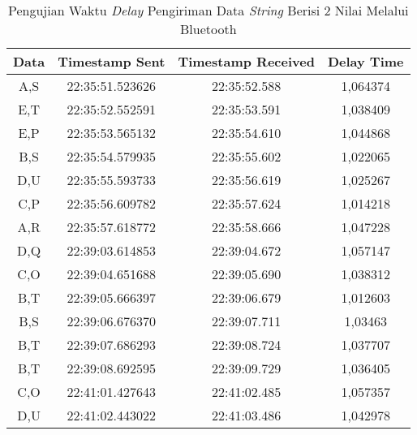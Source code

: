 \begin{table}[!ht]
  \centering
  \caption{Pengujian Waktu \emph{Delay} Pengiriman Data \emph{String} Berisi 2 Nilai Melalui Bluetooth}
  \label{tbl:delayBluetooth}
  \begin{tabular}{|ccc|c|}
  \hline
  \multicolumn{1}{|c|}{Data} & \multicolumn{1}{c|}{Timestamp Sent}  & Timestamp Received & Delay Time  \\ \hline
  \multicolumn{1}{|c|}{A,S}  & \multicolumn{1}{c|}{22:35:51.523626} & 22:35:52.588       & 1,064374    \\ \hline
  \multicolumn{1}{|c|}{E,T}  & \multicolumn{1}{c|}{22:35:52.552591} & 22:35:53.591       & 1,038409    \\ \hline
  \multicolumn{1}{|c|}{E,P}  & \multicolumn{1}{c|}{22:35:53.565132} & 22:35:54.610       & 1,044868    \\ \hline
  \multicolumn{1}{|c|}{B,S}  & \multicolumn{1}{c|}{22:35:54.579935} & 22:35:55.602       & 1,022065    \\ \hline
  \multicolumn{1}{|c|}{D,U}  & \multicolumn{1}{c|}{22:35:55.593733} & 22:35:56.619       & 1,025267    \\ \hline
  \multicolumn{1}{|c|}{C,P}  & \multicolumn{1}{c|}{22:35:56.609782} & 22:35:57.624       & 1,014218    \\ \hline
  \multicolumn{1}{|c|}{A,R}  & \multicolumn{1}{c|}{22:35:57.618772} & 22:35:58.666       & 1,047228    \\ \hline
  \multicolumn{1}{|c|}{D,Q}  & \multicolumn{1}{c|}{22:39:03.614853} & 22:39:04.672       & 1,057147    \\ \hline
  \multicolumn{1}{|c|}{C,O}  & \multicolumn{1}{c|}{22:39:04.651688} & 22:39:05.690       & 1,038312    \\ \hline
  \multicolumn{1}{|c|}{B,T}  & \multicolumn{1}{c|}{22:39:05.666397} & 22:39:06.679       & 1,012603    \\ \hline
  \multicolumn{1}{|c|}{B,S}  & \multicolumn{1}{c|}{22:39:06.676370} & 22:39:07.711       & 1,03463     \\ \hline
  \multicolumn{1}{|c|}{B,T}  & \multicolumn{1}{c|}{22:39:07.686293} & 22:39:08.724       & 1,037707    \\ \hline
  \multicolumn{1}{|c|}{B,T}  & \multicolumn{1}{c|}{22:39:08.692595} & 22:39:09.729       & 1,036405    \\ \hline
  \multicolumn{1}{|c|}{C,O}  & \multicolumn{1}{c|}{22:41:01.427643} & 22:41:02.485       & 1,057357    \\ \hline
  \multicolumn{1}{|c|}{D,U}  & \multicolumn{1}{c|}{22:41:02.443022} & 22:41:03.486       & 1,042978    \\ \hline

\end{tabular}
\end{table}
